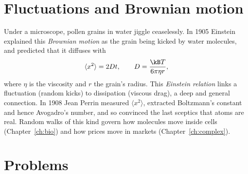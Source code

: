 \section{Fluctuations and Brownian motion}

Under a microscope, pollen grains in water jiggle ceaselessly. In 1905 Einstein explained this \emph{Brownian motion} as the grain being kicked by water molecules, and predicted that it diffuses with
\[
  \langle x^2\rangle = 2Dt, \qquad D = \frac{\kB T}{6\pi\eta r},
\]
where $\eta$ is the viscosity and $r$ the grain's radius. This \emph{Einstein relation} links a fluctuation (random kicks) to dissipation (viscous drag), a deep and general connection. In 1908 Jean Perrin measured $\langle x^2\rangle$, extracted Boltzmann's constant and hence Avogadro's number, and so convinced the last sceptics that atoms are real. Random walks of this kind govern how molecules move inside cells (Chapter~\ref{ch:bio}) and how prices move in markets (Chapter~\ref{ch:complex}).

\section{Problems}

